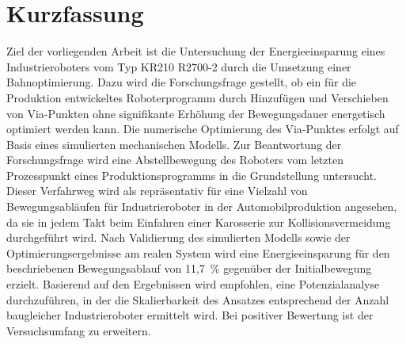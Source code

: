 \chapter*{Kurzfassung} %
Ziel der vorliegenden Arbeit ist die Untersuchung der Energieeinsparung eines Industrieroboters vom Typ KR210 R2700-2 durch die Umsetzung einer Bahnoptimierung. Dazu wird die Forschungsfrage gestellt, ob ein für die Produktion entwickeltes Roboterprogramm durch Hinzufügen und Verschieben von Via-Punkten ohne signifikante Erhöhung der Bewegungsdauer energetisch optimiert werden kann. Die numerische Optimierung des Via-Punktes erfolgt auf Basis eines simulierten mechanischen Modells. Zur Beantwortung der Forschungsfrage wird eine Abstellbewegung des Roboters vom letzten Prozesspunkt eines Produktionsprogramms in die Grundstellung untersucht. Dieser Verfahrweg wird als repräsentativ für eine Vielzahl von Bewegungsabläufen für Industrieroboter in der Automobilproduktion angesehen, da sie in jedem Takt beim Einfahren einer Karosserie zur Kollisionsvermeidung durchgeführt wird. Nach Validierung des simulierten Modells sowie der Optimierungsergebnisse am realen System wird  eine Energieeinsparung für den beschriebenen Bewegungsablauf von 11,7~\% gegenüber der Initialbewegung erzielt. Basierend auf den Ergebnissen wird empfohlen, eine Potenzialanalyse durchzuführen, in der die Skalierbarkeit des Ansatzes entsprechend der Anzahl baugleicher  Industrieroboter ermittelt wird. Bei positiver Bewertung ist der Versuchsumfang zu erweitern.
\cleardoublepage
